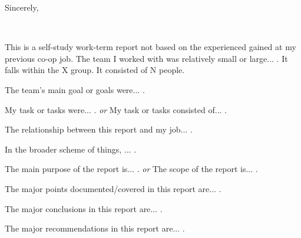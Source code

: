 \documentclass{ece}
\begin{document}
Sincerely,
\vspace*{6\baselineskip}

\printauthorname\\
\printstudentnumber


\contributions

This is a self-study work-term report not based on the experienced gained at my previous co-op job.  The team I worked with was relatively small or large... .  It falls within the X group.  It consisted of N people.

The team's main goal or goals were... .

My task or tasks were... .  \emph{or}  My task or tasks consisted of... .

The relationship between this report and my job... .

In the broader scheme of things, ... .


\summary

The main purpose of the report is... .  \emph{or}  The scope of the report is... .

The major points documented/covered in this report are... .

The major conclusions in this report are... .

The major recommendations in this report are... .

\end{document}
